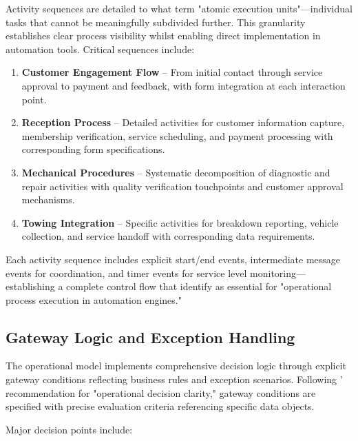 \documentclass[14pt,a4paper]{article}
\begin{document}
Activity sequences are detailed to what \textit{\parencite[p. 83]{Meyer2019}} term "atomic execution units"—individual tasks that cannot be meaningfully subdivided further. This granularity establishes clear process visibility whilst enabling direct implementation in automation tools. Critical sequences include:

\begin{enumerate}
    \item \textbf{Customer Engagement Flow} – From initial contact through service approval to payment and feedback, with form integration at each interaction point.

    \item \textbf{Reception Process} – Detailed activities for customer information capture, membership verification, service scheduling, and payment processing with corresponding form specifications.

    \item \textbf{Mechanical Procedures} – Systematic decomposition of diagnostic and repair activities with quality verification touchpoints and customer approval mechanisms.

    \item \textbf{Towing Integration} – Specific activities for breakdown reporting, vehicle collection, and service handoff with corresponding data requirements.
\end{enumerate}

Each activity sequence includes explicit start/end events, intermediate message events for coordination, and timer events for service level monitoring—establishing a complete control flow that \textit{\parencite[p. 259]{vanderAalst2016}} identify as essential for "operational process execution in automation engines."

\subsection{Gateway Logic and Exception Handling}

The operational model implements comprehensive decision logic through explicit gateway conditions reflecting business rules and exception scenarios. Following \textit{\parencite[p. 117]{Corradini2018}}' recommendation for "operational decision clarity," gateway conditions are specified with precise evaluation criteria referencing specific data objects.

Major decision points include:
\end{document}
